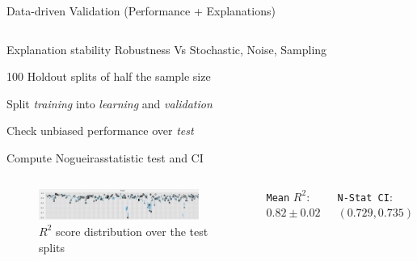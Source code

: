 \documentclass[compress,ignorenonframetext,aspectratio=1610,handout]{beamer}
\begin{document}
\begin{frame}{Data-driven Validation (Performance + Explanations)}
	\begin{columns}
		
		
			\begin{block}{Explanation stability}
				Robustness Vs Stochastic, Noise, Sampling
				
				100 Holdout splits of half the sample size
				
				Split \textit{training} into \textit{learning} and \textit{validation}
				
				Check unbiased performance over \textit{test}
				
				Compute Nogueiras\footnotemark statistic test and CI
				
			\end{block}

		
	\end{columns}

	\pause
	
	\vspace{1em}%
	
	\begin{columns}
		\column{0.67\textwidth}
		\begin{figure}
			\centering
			\includegraphics[width=0.9\textwidth]{figs/methods/cv_performance_distribution.pdf}
			\caption{$R^2$ score distribution over the test splits}
		\end{figure}
	
		\column{0.33\textwidth}
		\texttt{Mean} $R^2$: $0.82 \pm 0.02$
		
		\texttt{N-Stat CI}: $(0.729, 0.735)$
		
	\end{columns}
	

\end{frame}
\end{document}
